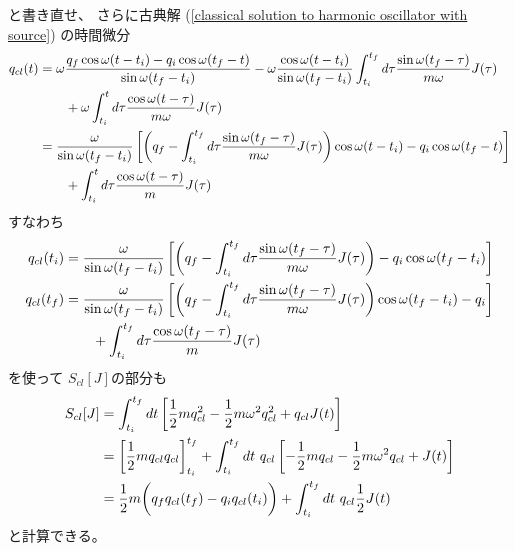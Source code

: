 と書き直せ、
さらに古典解
(\ref{classical solution to harmonic oscillator with source})
の時間微分
\begin{align}
    \dot{q}_{cl}(t)
    &=
    \omega
    \frac{
        q_f \cos \omega (t - t_i)
        -
        q_i \cos \omega (t_f - t)
    }{ \sin \omega (t_f - t_i) }
    -
    \omega
    \frac{ \cos \omega (t - t_i) }{
        \sin \omega(t_f - t_i)
    }
    \int_{t_i}^{t_f} d\tau
    \frac{ \sin \omega (t_f-\tau) }{m\omega}
    J(\tau)
\notag\\&\qquad
    +
    \omega
    \int_{t_i}^t d\tau
    \frac{ \cos \omega (t-\tau)}{m\omega}
    J(\tau)
\notag\\&=
    \frac{ \omega }{ \sin \omega (t_f - t_i) }
    \left[
    \left(
        q_f
    -
        \int_{t_i}^{t_f} d\tau
        \frac{ \sin \omega (t_f-\tau) }{m\omega}
        J(\tau)
    \right)
    \cos \omega (t - t_i)
    -
        q_i \cos \omega (t_f - t)
    \right]
\notag\\&\qquad
    +
    \int_{t_i}^t d\tau
    \frac{ \cos \omega (t-\tau)}{m}
    J(\tau)
\label{time derivative of classical solution of harm osci with source}
\end{align}
すなわち
\begin{subequations}
\begin{align}
    \dot{q}_{cl} (t_i)
    &=
    \dfrac{ \omega }{ \sin \omega (t_f - t_i) }
    \left[
    \left(
        q_f
    -
        \int_{t_i}^{t_f} d\tau
        \frac{ \sin \omega (t_f-\tau) }{m\omega}
        J(\tau)
    \right)
    -
        q_i \cos \omega (t_f - t_i)
    \right]
\\
    \dot{q}_{cl} (t_f)
    &=
    \frac{ \omega }{ \sin \omega (t_f - t_i) }
    \left[
    \left(
        q_f
   - 
        \int_{t_i}^{t_f} d\tau
        \frac{ \sin \omega (t_f-\tau) }{m\omega}
        J(\tau)
    \right)
    \cos \omega (t_f - t_i)
    -
        q_i
    \right]
\notag\\&\qquad
    +
    \int_{t_i}^{t_f} d\tau
    \frac{ \cos \omega (t_f - \tau)}{m}
    J(\tau)
\end{align}
\label{boundary value of time derivative of classical solution of harm osci with source}
\end{subequations}
を使って
$S_{cl} [J]$の部分も
\begin{align}
    S_{cl} [J]
    &=
    \int_{t_i}^{t_f} dt
    \left[
        \frac{1}{2}m
        \dot{q}_{cl}^2
    -
        \frac{1}{2} m \omega^2
        q_{cl}^2
    +
        q_{cl}
        J(t)
    \right]
\notag\\&=
    \left[
        \frac{1}{2}m
        q_{cl}
        \dot{q}_{cl}
    \right]_{t_i}^{t_f}
    +
    \int_{t_i}^{t_f} dt\ 
    q_{cl}
    \left[
    -
        \frac{1}{2} m
        \ddot{q}_{cl}
    -
        \frac{1}{2} m \omega^2
        q_{cl}
    +
        J(t)
    \right]
\notag\\&=
    \frac{1}{2} m
    \bigg(
        q_f
        \dot{q}_{cl}(t_f)
    -
        q_i
        \dot{q}_{cl}(t_i)
    \bigg)
    +
    \int_{t_i}^{t_f} dt\ 
        q_{cl}
        \frac{1}{2}
        J(t)
\label{classical action of harm osci with source}
\end{align}
と計算できる。

